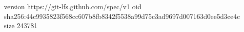 version https://git-lfs.github.com/spec/v1
oid sha256:44c9935823f568cc607b8fb8342f5538a99d75c3ad9697d007163d0ee5d3ce4c
size 243781
